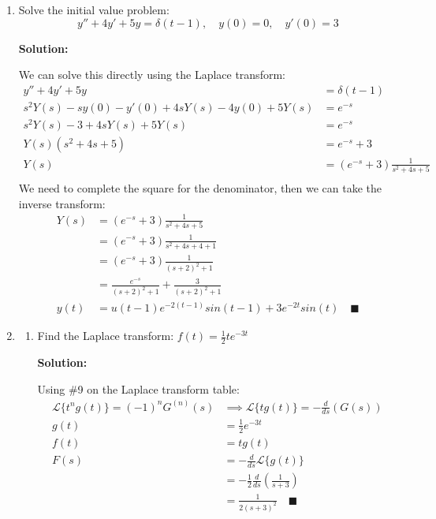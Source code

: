 \documentclass[letterpaper, fontsize=11pt]{scrartcl} %
\numberwithin{equation}{section} %
\numberwithin{figure}{section} %
\numberwithin{table}{section} %
\begin{document}
\begin{enumerate}
\item Solve the initial value problem:
$$y'' + 4y' + 5y = \delta(t-1),\quad y(0) = 0,\quad y'(0) = 3$$
\par \textbf{Solution:}
\par We can solve this directly using the Laplace transform:
\begin{align*}
y'' + 4y' + 5y &= \delta(t-1)\\
s^2 Y(s) - sy(0) - y'(0) + 4sY(s) - 4y(0) + 5Y(s) &= e^{-s}\\
s^2 Y(s) - 3 + 4sY(s) + 5Y(s) &= e^{-s}\\
Y(s)\left(s^2 + 4s + 5\right) &= e^{-s} + 3\\
Y(s) &= \left(e^{-s} + 3\right)\frac{1}{s^2 + 4s + 5}\\
\end{align*}
We need to complete the square for the denominator, then we can take the inverse transform:
\begin{align*}
Y(s) &= \left(e^{-s} + 3\right)\frac{1}{s^2 + 4s + 5}\\
&= \left(e^{-s} + 3\right)\frac{1}{s^2 + 4s +4 + 1} \\
&= \left(e^{-s} + 3\right)\frac{1}{(s+2)^2 + 1} \\
&= \frac{e^{-s}}{(s+2)^2 + 1} + \frac{3}{(s+2)^2 + 1} \\
y(t) &= u(t-1)e^{-2(t-1)}sin(t-1) + 3e^{-2t}sin(t) \quad\blacksquare
\end{align*}

\item 
\begin{enumerate}
\item Find the Laplace transform: $f(t) = \frac{1}{2}te^{-3t}$
\par \textbf{Solution:}
\par Using \#9 on the Laplace transform table:
\begin{align*}
\mathcal{L}\{t^n g(t)\} = (-1)^n G^{(n)}(s)&\implies \mathcal{L}\{tg(t)\} = -\frac{d}{ds}(G(s))\\
g(t) &= \frac{1}{2}e^{-3t}\\
f(t) &= tg(t)\\
F(s) &= -\frac{d}{ds}\mathcal{L}\{g(t)\}\\
&= -\frac{1}{2}\frac{d}{ds}\left(\frac{1}{s+3}\right)\\
&= \frac{1}{2(s+3)^2}\quad\blacksquare\\
\end{align*}


\end{enumerate}
\end{enumerate}
\end{document}
